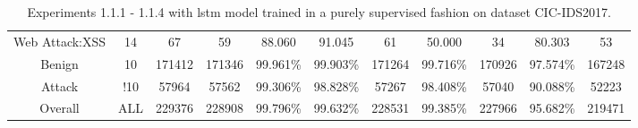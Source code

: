 \begin{table}[htb]
\begin{tabular}{@{}ccccccccccc@{}}
        Web Attack:XSS &  14 &  67 &  59 &  88.060 &  91.045 &  61 &  50.000 &  34 &  80.303 &  53 \\
        Benign &  10 &  171412 &  171346 &  99.961\% &  99.903\% &  171264 &  99.716\% &  170926 &  97.574\% &  167248 \\
        Attack &  !10 &  57964 &  57562 &  99.306\% &  98.828\% &  57267 &  98.408\% &  57040 &  90.088\% &  52223 \\
        Overall &  ALL &  229376 &  228908 &  99.796\% &  99.632\% &  228531 &  99.385\% &  227966 &  95.682\% &  219471 \\
        \bottomrule
    \end{tabular}
    \caption{Experiments 1.1.1 - 1.1.4 with \gls{lstm} model trained in a purely supervised fashion on dataset CIC-IDS2017.}
    \label{table:results:lstm:flows_supervised}
\end{table}